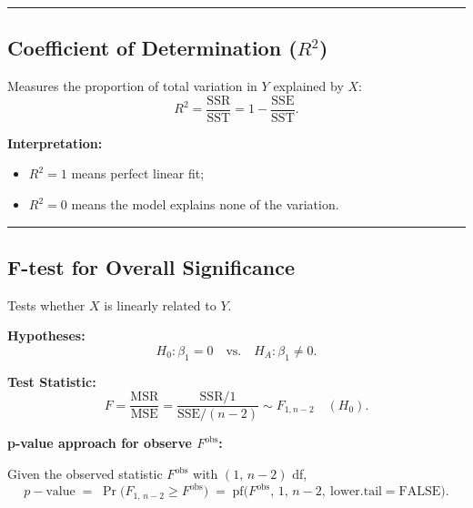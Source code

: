 \documentclass[
  letterpaper,
]{scrbook}
\providecommand{\tightlist}{%
  \setlength{\itemsep}{0pt}\setlength{\parskip}{0pt}}\usepackage{longtable,booktabs,array}
\begin{document}
\begin{center}\rule{0.5\linewidth}{0.5pt}\end{center}

\subsection{\texorpdfstring{Coefficient of Determination
(\(R^2\))}{Coefficient of Determination (R\^{}2)}}\label{coefficient-of-determination-r2}

Measures the proportion of total variation in \(Y\) explained by \(X\):
\[
R^2 = \frac{\mathrm{SSR}}{\mathrm{SST}}
= 1 - \frac{\mathrm{SSE}}{\mathrm{SST}}.
\]

\textbf{Interpretation:}

\begin{itemize}
\tightlist
\item
  \(R^2 = 1\) means perfect linear fit;
\item
  \(R^2 = 0\) means the model explains none of the variation.
\end{itemize}

\begin{center}\rule{0.5\linewidth}{0.5pt}\end{center}

\subsection{F-test for Overall
Significance}\label{f-test-for-overall-significance}

Tests whether \(X\) is linearly related to \(Y\).

\textbf{Hypotheses:} \[
H_0: \beta_1 = 0
\quad \text{vs.} \quad
H_A: \beta_1 \ne 0.
\]

\textbf{Test Statistic:} \[
F = \frac{\text{MSR}}{\text{MSE}}
= \frac{\text{SSR}/1}{\text{SSE}/(n-2)}
\sim F_{1,n-2}\quad (H_0).
\]

\textbf{p-value approach for observe \(F^{\mathrm{obs}}\):}

Given the observed statistic \(F^{\text{obs}}\) with \((1,\,n-2)\) df,
\[
p-\text{value} \;=\; \Pr\!\big(F_{1,\,n-2} \ge F^{\text{obs}}\big)
\;=\; \mathrm{pf}\!\big(F^{\text{obs}},\,1,\,n-2,\ \text{lower.tail}= \mathrm{FALSE}\big).
\]
\end{document}

